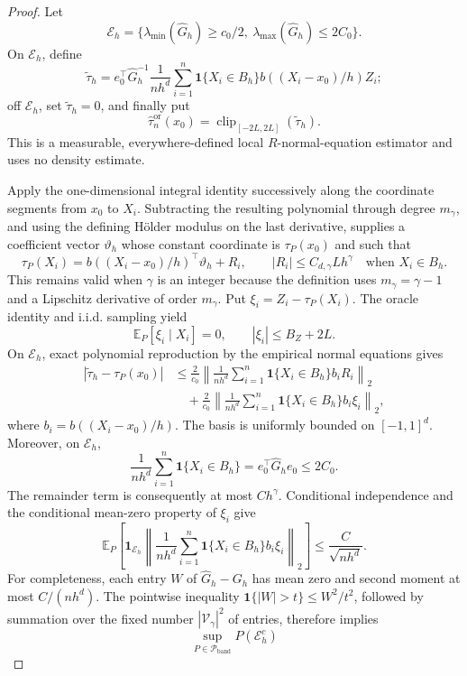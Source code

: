 \documentclass{article}
\begin{document}
\begin{proof}
Let
\[
 \mathcal E_h=\{\lambda_{\min}(\widehat G_h)\ge c_0/2,
 \ \lambda_{\max}(\widehat G_h)\le2C_0\}.
\]
On \(\mathcal E_h\), define
\[
 \widetilde\tau_h=e_0^\top\widehat G_h^{-1}
 \frac1{nh^d}\sum_{i=1}^n\mathbf1\{X_i\in B_h\}
 b((X_i-x_0)/h)Z_i;
\]
off \(\mathcal E_h\), set \(\widetilde\tau_h=0\), and finally put
\[
 \widehat\tau_n^{\mathrm{or}}(x_0)
 =\operatorname{clip}_{[-2L,2L]}(\widetilde\tau_h).
\]
This is a measurable, everywhere-defined local \(R\)-normal-equation estimator and uses no density estimate.

Apply the one-dimensional integral identity successively along the coordinate segments from \(x_0\) to \(X_i\).  Subtracting the resulting polynomial through degree \(m_\gamma\), and using the defining H\"older modulus on the last derivative, supplies a coefficient vector \(\vartheta_h\) whose constant coordinate is \(\tau_P(x_0)\) and such that
\[
 \tau_P(X_i)=b((X_i-x_0)/h)^\top\vartheta_h+R_i,
 \qquad |R_i|\le C_{d,\gamma}Lh^\gamma
 \quad\text{when }X_i\in B_h.
\]
This remains valid when \(\gamma\) is an integer because the definition uses \(m_\gamma=\gamma-1\) and a Lipschitz derivative of order \(m_\gamma\).  Put \(\xi_i=Z_i-\tau_P(X_i)\).  The oracle identity and i.i.d. sampling yield
\[
 \mathbb E_P[\xi_i\mid X_i]=0,
 \qquad |\xi_i|\le B_Z+2L.
\]
On \(\mathcal E_h\), exact polynomial reproduction by the empirical normal equations gives
\[
\begin{aligned}
 |\widetilde\tau_h-\tau_P(x_0)|
 &\le \frac2{c_0}\left\|
 \frac1{nh^d}\sum_{i=1}^n\mathbf1\{X_i\in B_h\}b_iR_i
 \right\|_2\\
 &\quad+\frac2{c_0}\left\|
 \frac1{nh^d}\sum_{i=1}^n\mathbf1\{X_i\in B_h\}b_i\xi_i
 \right\|_2,
\end{aligned}
\]
where \(b_i=b((X_i-x_0)/h)\).  The basis is uniformly bounded on \([-1,1]^d\).  Moreover, on \(\mathcal E_h\),
\[
 \frac1{nh^d}\sum_{i=1}^n\mathbf1\{X_i\in B_h\}
 =e_0^\top\widehat G_he_0\le2C_0.
\]
The remainder term is consequently at most \(C h^\gamma\).  Conditional independence and the conditional mean-zero property of \(\xi_i\) give
\[
 \mathbb E_P\left[
 \mathbf1_{\mathcal E_h}
 \left\|\frac1{nh^d}\sum_{i=1}^n
 \mathbf1\{X_i\in B_h\}b_i\xi_i\right\|_2\right]
 \le \frac{C}{\sqrt{nh^d}}.
\]
For completeness, each entry \(W\) of \(\widehat G_h-G_h\) has mean zero and second moment at most \(C/(nh^d)\).  The pointwise inequality \(\mathbf1\{|W|>t\}\le W^2/t^2\), followed by summation over the fixed number \(|\mathcal V_\gamma|^2\) of entries, therefore implies
\[
 \sup_{P\in\mathcal P_{\mathrm{band}}}P(\mathcal E_h^c)
\]
\end{proof}
\end{document}
